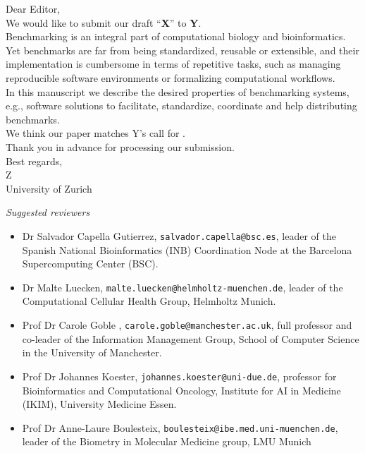 \documentclass[a4paper]{article}
\newcommand{\submission}{X}
\newcommand{\journal}{Y}
\newcommand{\submitter}{Z}
\begin{document}
\noindent Dear Editor,\\

We would like to submit our draft ``\textbf{\submission}'' to \textbf{\journal}.\\

Benchmarking is an integral part of computational biology and bioinformatics. Yet benchmarks are far from being standardized, reusable or extensible, and their implementation is cumbersome in terms of repetitive tasks, such as managing reproducible software environments or formalizing computational workflows.\\ 

In this manuscript we describe the desired properties of benchmarking systems, e.g., software solutions to facilitate, standardize, coordinate and help distributing benchmarks.\\

We think our paper matches \journal's call for .\\

Thank you in advance for processing our submission. \\

Best regards,\\

\submitter\\
\indent University of Zurich\\

\vspace{1cm}

\textit{Suggested reviewers}

\begin{itemize}
    \item Dr Salvador Capella Gutierrez, \texttt{salvador.capella@bsc.es}, leader of the Spanish National Bioinformatics (INB) Coordination Node at the Barcelona Supercomputing Center (BSC).
    \item Dr Malte Luecken, \texttt{malte.luecken@helmholtz-muenchen.de}, leader of the Computational Cellular Health Group, Helmholtz Munich.
    \item Prof Dr Carole Goble , \texttt{carole.goble@manchester.ac.uk}, full professor and co-leader of the Information Management Group, School of Computer Science in the University of Manchester.
    \item Prof Dr Johannes Koester, \texttt{johannes.koester@uni-due.de}, professor for Bioinformatics and Computational Oncology, Institute for AI in Medicine (IKIM), University Medicine Essen.
    \item Prof Dr Anne-Laure Boulesteix, \texttt{boulesteix@ibe.med.uni-muenchen.de}, leader of the Biometry in Molecular Medicine group, LMU Munich
\end{itemize}
\end{document}
